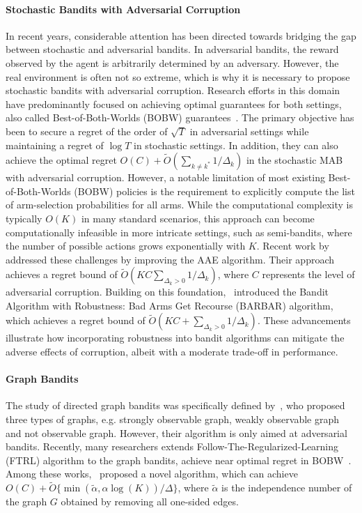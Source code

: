 \paragraph{Stochastic Bandits with Adversarial Corruption}
In recent years, considerable attention has been directed towards bridging the gap between stochastic and adversarial bandits. In adversarial bandits, the reward observed by the agent is arbitrarily determined by an adversary. However, the real environment is often not so extreme, which is why it is necessary to propose stochastic bandits with adversarial corruption. Research efforts in this domain have predominantly focused on achieving optimal guarantees for both settings, also called Best-of-Both-Worlds (BOBW) guarantees~\citep{bubeck2012best,seldin2014one,auer2016algorithm,seldin2017improved,wei2018more,zimmert2021tsallis,ito2021parameter,jin2024improved,tsuchiya2024stability}. The primary objective has been to secure a regret of the order of $\sqrt{T}$ in adversarial settings while maintaining a regret of $\log T$ in stochastic settings. In addition, they can also achieve the optimal regret $O(C) + \widetilde{O}(\sum_{k \neq k^*}1 / \Delta_k)$ in the stochastic MAB with adversarial corruption. However, a notable limitation of most existing Best-of-Both-Worlds (BOBW) policies is the requirement to explicitly compute the list of arm-selection probabilities for all arms. While the computational complexity is typically $O(K)$
in many standard scenarios, this approach can become computationally infeasible in more intricate settings, such as semi-bandits, where the number of possible actions grows exponentially with $K$. Recent work by~\cite{lykouris2018stochastic} addressed these challenges by improving the AAE algorithm. Their approach achieves a regret bound of $\widetilde{O}\left(KC\sum_{\Delta_k > 0}1 / \Delta_k\right)$, where $C$ represents the level of adversarial corruption. Building on this foundation,~\cite{gupta2019better} introduced the Bandit Algorithm with Robustness: Bad Arms Get Recourse (BARBAR) algorithm, which achieves a regret bound of $\widetilde{O}\left(KC + \sum_{\Delta_k > 0}1 / \Delta_k\right)$. These advancements illustrate how incorporating robustness into bandit algorithms can mitigate the adverse effects of corruption, albeit with a moderate trade-off in performance. 

\paragraph{Graph Bandits}
The study of directed graph bandits was specifically defined by~\cite{alon2015online}, who proposed three types of graphs, e.g. strongly observable graph, weakly observable graph and not observable graph. However, their algorithm is only aimed at adversarial bandits. Recently, many researchers extends Follow-The-Regularized-Learning (FTRL) algorithm to the graph bandits, achieve near optimal regret in BOBW~\citep{erez2021towards,rouyer2022near,ito2022nearly,dann2023blackbox}. Among these works,~\cite{dann2023blackbox} proposed a novel algorithm, which can achieve $O(C) + \widetilde{O}\{\min (\widetilde{\alpha},\alpha \log(K)) / \Delta\}$, where $\widetilde{\alpha}$ is the independence number of the graph $G$ obtained by removing all one-sided edges. 

